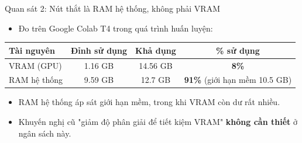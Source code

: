 
\begin{frame}{Quan sát 2: Nút thắt là RAM hệ thống, không phải VRAM}
\begin{itemize}
    \item Đo trên Google Colab T4 trong quá trình huấn luyện:
\end{itemize}
\footnotesize
\begin{table}[]
\centering
\begin{tabular}{lccc}
\toprule
Tài nguyên & Đỉnh sử dụng & Khả dụng & \% sử dụng \\
\midrule
VRAM (GPU) & 1.16 GB & 14.56 GB & \textbf{8\%} \\
RAM hệ thống & 9.59 GB & 12.7 GB & \textbf{91\%} (giới hạn mềm 10.5 GB) \\
\bottomrule
\end{tabular}
\end{table}
\normalsize
\begin{itemize}
    \item RAM hệ thống áp sát giới hạn mềm, trong khi VRAM còn dư rất nhiều.
    \item Khuyến nghị cũ "giảm độ phân giải để tiết kiệm VRAM" \textbf{không cần thiết} ở ngân sách này.
\end{itemize}
\end{frame}


